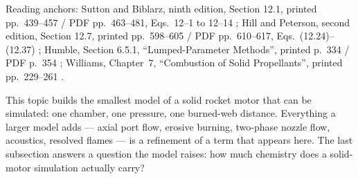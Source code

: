 
Reading anchors: Sutton and Biblarz, ninth edition, Section 12.1, printed
pp.~439--457 / PDF pp.~463--481, Eqs.~12--1 to 12--14 \cite{sutton};
Hill and Peterson, second edition, Section 12.7, printed pp.~598--605 / PDF
pp.~610--617, Eqs.~(12.24)--(12.37) \cite{hillpeterson}; Humble,
Section 6.5.1, ``Lumped-Parameter Methods'', printed p.~334 / PDF p.~354
\cite{humble}; Williams, Chapter~7, ``Combustion of Solid Propellants'',
printed pp.~229--261 \cite{williams}.

This topic builds the smallest model of a solid rocket motor that can be
simulated: one chamber, one pressure, one burned-web distance. Everything a
larger model adds --- axial port flow, erosive burning, two-phase nozzle flow,
acoustics, resolved flames --- is a refinement of a term that appears here.
The last subsection answers a question the model raises: how much chemistry
does a solid-motor simulation actually carry?

